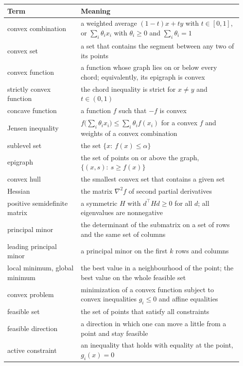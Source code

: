 \documentclass[11pt,a4paper]{article}
\begin{document}
\begin{longtable}{@{}>{\raggedright\arraybackslash}p{0.3\linewidth}>{\raggedright\arraybackslash}p{0.66\linewidth}@{}}
\toprule
\textbf{Term} & \textbf{Meaning} \\
\midrule
\endhead
\bottomrule
\endlastfoot
convex combination & a weighted average $(1-t)x + ty$ with $t \in [0, 1]$, or $\sum_i \theta_i x_i$ with $\theta_i \ge 0$ and $\sum_i \theta_i = 1$ \\
convex set & a set that contains the segment between any two of its points \\
convex function & a function whose graph lies on or below every chord; equivalently, its epigraph is convex \\
strictly convex function & the chord inequality is strict for $x \ne y$ and $t \in (0, 1)$ \\
concave function & a function $f$ such that $-f$ is convex \\
Jensen inequality & $f\big(\sum_i \theta_i x_i\big) \le \sum_i \theta_i f(x_i)$ for a convex $f$ and weights of a convex combination \\
sublevel set & the set $\{x:\ f(x) \le \alpha\}$ \\
epigraph & the set of points on or above the graph, $\{(x, s):\ s \ge f(x)\}$ \\
convex hull & the smallest convex set that contains a given set \\
Hessian & the matrix $\nabla^2 f$ of second partial derivatives \\
positive semidefinite matrix & a symmetric $H$ with $d^\top H d \ge 0$ for all $d$; all eigenvalues are nonnegative \\
principal minor & the determinant of the submatrix on a set of rows and the same set of columns \\
leading principal minor & a principal minor on the first $k$ rows and columns \\
local minimum, global minimum & the best value in a neighbourhood of the point; the best value on the whole feasible set \\
convex problem & minimization of a convex function subject to convex inequalities $g_i \le 0$ and affine equalities \\
feasible set & the set of points that satisfy all constraints \\
feasible direction & a direction in which one can move a little from a point and stay feasible \\
active constraint & an inequality that holds with equality at the point, $g_i(x) = 0$ \\

\end{longtable}
\end{document}
